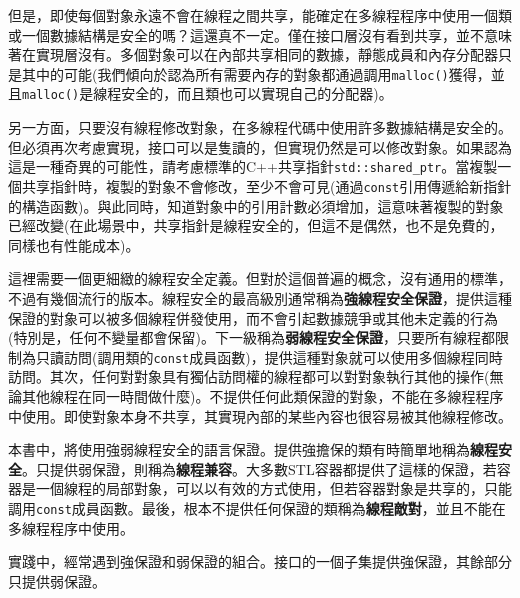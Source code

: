 但是，即使每個對象永遠不會在線程之間共享，能確定在多線程程序中使用一個類或一個數據結構是安全的嗎？這還真不一定。僅在接口層沒有看到共享，並不意味著在實現層沒有。多個對象可以在內部共享相同的數據，靜態成員和內存分配器只是其中的可能(我們傾向於認為所有需要內存的對象都通過調用\texttt{malloc()}獲得，並且\texttt{malloc()}是線程安全的，而且類也可以實現自己的分配器)。

另一方面，只要沒有線程修改對象，在多線程代碼中使用許多數據結構是安全的。但必須再次考慮實現，接口可以是隻讀的，但實現仍然是可以修改對象。如果認為這是一種奇異的可能性，請考慮標準的C++共享指針\texttt{std::shared\_ptr}。當複製一個共享指針時，複製的對象不會修改，至少不會可見(通過\texttt{const}引用傳遞給新指針的構造函數)。與此同時，知道對象中的引用計數必須增加，這意味著複製的對象已經改變(在此場景中，共享指針是線程安全的，但這不是偶然，也不是免費的，同樣也有性能成本)。

這裡需要一個更細緻的線程安全定義。但對於這個普遍的概念，沒有通用的標準，不過有幾個流行的版本。線程安全的最高級別通常稱為\textbf{強線程安全保證}，提供這種保證的對象可以被多個線程併發使用，而不會引起數據競爭或其他未定義的行為(特別是，任何不變量都會保留)。下一級稱為\textbf{弱線程安全保證}，只要所有線程都限制為只讀訪問(調用類的\texttt{const}成員函數)，提供這種對象就可以使用多個線程同時訪問。其次，任何對對象具有獨佔訪問權的線程都可以對對象執行其他的操作(無論其他線程在同一時間做什麼)。不提供任何此類保證的對象，不能在多線程程序中使用。即使對象本身不共享，其實現內部的某些內容也很容易被其他線程修改。

本書中，將使用強弱線程安全的語言保證。提供強擔保的類有時簡單地稱為\textbf{線程安全}。只提供弱保證，則稱為\textbf{線程兼容}。大多數STL容器都提供了這樣的保證，若容器是一個線程的局部對象，可以以有效的方式使用，但若容器對象是共享的，只能調用\texttt{const}成員函數。最後，根本不提供任何保證的類稱為\textbf{線程敵對}，並且不能在多線程程序中使用。

實踐中，經常遇到強保證和弱保證的組合。接口的一個子集提供強保證，其餘部分只提供弱保證。

